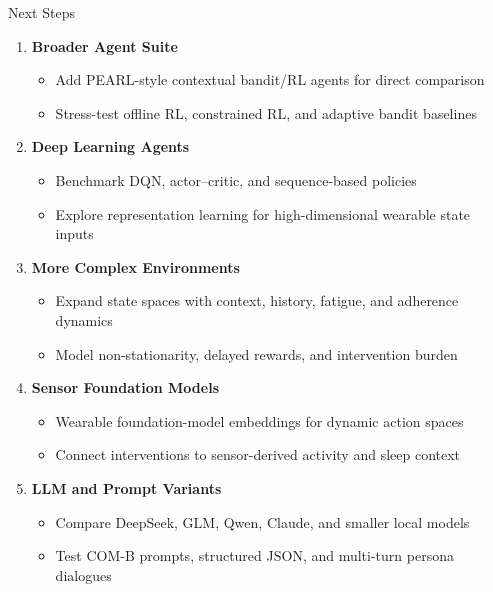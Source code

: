 \documentclass[aspectratio=169]{beamer}
\begin{document}
\begin{frame}{Next Steps}
    \small
    \setlength{\itemsep}{1pt}
    \begin{enumerate}
        \item \textbf{Broader Agent Suite}
        \begin{itemize}
            \item Add PEARL-style contextual bandit/RL agents for direct comparison
            \item Stress-test offline RL, constrained RL, and adaptive bandit baselines
        \end{itemize}

        \item \textbf{Deep Learning Agents}
        \begin{itemize}
            \item Benchmark DQN, actor--critic, and sequence-based policies
            \item Explore representation learning for high-dimensional wearable state inputs
        \end{itemize}

        \item \textbf{More Complex Environments}
        \begin{itemize}
            \item Expand state spaces with context, history, fatigue, and adherence dynamics
            \item Model non-stationarity, delayed rewards, and intervention burden
        \end{itemize}

        \item \textbf{Sensor Foundation Models}
        \begin{itemize}
            \item Wearable foundation-model embeddings for dynamic action spaces
            \item Connect interventions to sensor-derived activity and sleep context
        \end{itemize}

        \item \textbf{LLM and Prompt Variants}
        \begin{itemize}
            \item Compare DeepSeek, GLM, Qwen, Claude, and smaller local models
            \item Test COM-B prompts, structured JSON, and multi-turn persona dialogues
        \end{itemize}
    \end{enumerate}
\end{frame}

\end{document}
